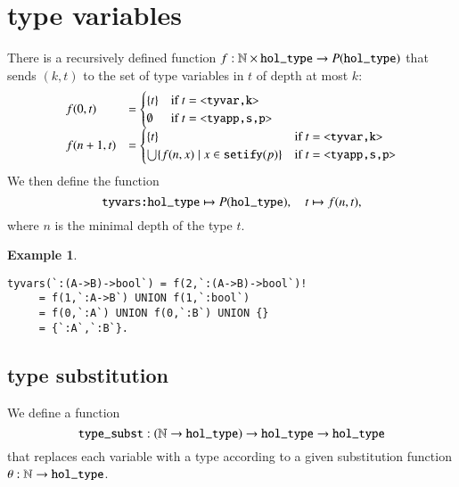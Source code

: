 \documentclass[cup9a]{cupbook}
\newtheorem{example}{Example}[chapter]
\begin{document}
\section{type variables}




There is a recursively defined function $f:\ring{N}\times \verb!hol_type!\to P(\verb!hol_type!)$ that sends $(k,t)$ to the set of type variables in $t$ of depth at most $k$:
$$
\begin{array}{lll}
f(0,t) &= \begin{cases} \{t\} &\hbox{if } t = \verb!<tyvar,k>!\\ \emptyset &\hbox{if } t = \verb!<tyapp,s,p>!\end{cases}\\
f(n+1,t) &= \begin{cases} \{t\} &\hbox{if } t= \verb!<tyvar,k>!\\ \bigcup\{ f(n,x) \mid x \in \verb!setify!(p) \} &\hbox{if } t = \verb!<tyapp,s,p>!\end{cases}\\
\end{array}
$$
We then define the function
$$
\verb!tyvars:hol_type!\mapsto P(\verb!hol_type!),\quad
t \mapsto f(n,t),
$$
where $n$ is the minimal depth of the type $t$.

\begin{example}
\begin{verbatim}
tyvars(`:(A->B)->bool`) = f(2,`:(A->B)->bool`)! 
     = f(1,`:A->B`) UNION f(1,`:bool`)
     = f(0,`:A`) UNION f(0,`:B`) UNION {}
     = {`:A`,`:B`}.
\end{verbatim}
\end{example}

\subsection{type substitution}

We define a function
$$
\verb!type_subst!:(\ring{N}\to \verb!hol_type!)\to \verb!hol_type! \to \verb!hol_type!
$$
that replaces each variable with a type according to a given substitution function $\theta:\ring{N}\to \verb!hol_type!$.
\end{document}
